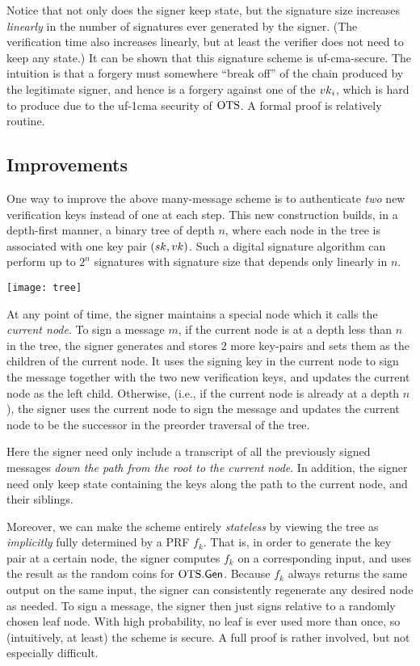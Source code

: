 \documentclass[11pt]{article}
\begin{document}
Notice that not only does the signer keep state, but the signature
size increases \emph{linearly} in the number of signatures ever
generated by the signer.  (The verification time also increases
linearly, but at least the verifier does not need to keep any state.)
It can be shown that this signature scheme is uf-cma-secure.  The
intuition is that a forgery must somewhere ``break off'' of the chain
produced by the legitimate signer, and hence is a forgery against one
of the $vk_{i}$, which is hard to produce due to the uf-1cma security
of $\text{OTS}$.  A formal proof is relatively routine.


\subsection{Improvements}
\label{sec:improvements}

One way to improve the above many-message scheme is to authenticate
\emph{two} new verification keys instead of one at each step.  This
new construction builds, in a depth-first manner, a binary tree of
depth $n$, where each node in the tree is associated with one key pair
$(sk,vk)$.  Such a digital signature algorithm can perform up to
$2^n$ signatures with signature size that depends only linearly in
$n$.

\begin{center}
\texttt{[image: tree]}
\end{center}

At any point of time, the signer maintains a special node which it
calls the \emph{current node}.  To sign a message $m$, if the current
node is at a depth less than $n$ in the tree, the signer generates and
stores $2$ more key-pairs and sets them as the children of the current
node.  It uses the signing key in the current node to sign the message
together with the two new verification keys, and updates the current
node as the left child.  Otherwise, (i.e., if the current node is
already at a depth $n$), the signer uses the current node to sign the
message and updates the current node to be the successor in the
preorder traversal of the tree.

Here the signer need only include a transcript of all the previously
signed messages \emph{down the path from the root to the current
  node}.  In addition, the signer need only keep state containing the
keys along the path to the current node, and their siblings.

Moreover, we can make the scheme entirely \emph{stateless} by viewing
the tree as \emph{implicitly} fully determined by a PRF $f_{k}$.  That
is, in order to generate the key pair at a certain node, the signer
computes $f_{k}$ on a corresponding input, and uses the result as the
random coins for $\text{OTS}.\mathsf{Gen}$.  Because $f_{k}$ always returns the
same output on the same input, the signer can consistently regenerate
any desired node as needed.  To sign a message, the signer then just
signs relative to a randomly chosen leaf node.  With high probability,
no leaf is ever used more than once, so (intuitively, at least) the
scheme is secure.  A full proof is rather involved, but not especially
difficult.
\end{document}
